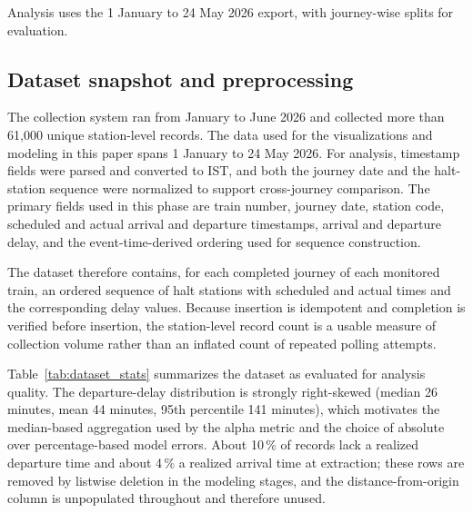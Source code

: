 \documentclass[a4paper,fleqn]{cas-dc}
\begin{document}
Analysis uses the 1 January to 24 May 2026 export, with journey-wise splits
for evaluation.

\subsection{Dataset snapshot and preprocessing}
The collection system ran from January to June 2026 and collected more than
61{,}000 unique station-level records. The data used for the visualizations
and modeling in this paper spans 1 January to 24 May 2026. For analysis,
timestamp fields were parsed and converted to IST, and both the journey date
and the halt-station sequence were normalized to support cross-journey
comparison. The primary fields used in this phase are train number, journey
date, station code, scheduled and actual arrival and departure timestamps,
arrival and departure delay, and the event-time-derived ordering used for
sequence construction.

The dataset therefore contains, for each completed journey of each monitored
train, an ordered sequence of halt stations with scheduled and actual times
and the corresponding delay values. Because insertion is idempotent and
completion is verified before insertion, the station-level record count is a
usable measure of collection volume rather than an inflated count of repeated
polling attempts.

Table~\ref{tab:dataset_stats} summarizes the dataset as evaluated for analysis
quality. The departure-delay distribution is strongly right-skewed (median
26 minutes, mean 44 minutes, 95th percentile 141 minutes), which motivates the
median-based aggregation used by the alpha metric and the choice of absolute
over percentage-based model errors. About 10\,\% of records lack a realized
departure time and about 4\,\% a realized arrival time at extraction; these
rows are removed by listwise deletion in the modeling stages, and the
distance-from-origin column is unpopulated throughout and therefore unused.
\end{document}
